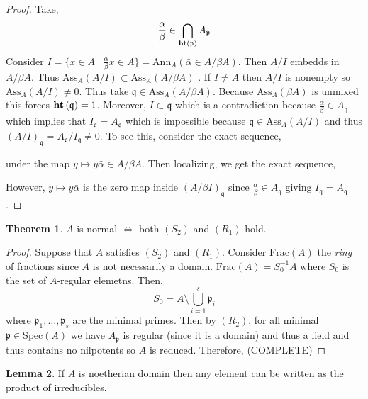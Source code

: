 \documentclass[12pt]{article}
\newcommand{\Frac}[1]{\mathrm{Frac}\left(#1\right)}
\newcommand{\Ann}[2]{\mathrm{Ann}_{#1}\left(#2\right)}
\newcommand{\Ass}[2]{\mathrm{Ass}_{#1}\left( #2 \right)}
\newcommand{\Spec}[1]{\mathrm{Spec}\left( #1 \right)}
\newcommand{\p}{\mathfrak{p}}
\newcommand{\q}{\mathfrak{q}}
\theoremstyle{remark}
\theoremstyle{definition}
\newtheorem{theorem}{Theorem}[section]
\newtheorem{lemma}[theorem]{Lemma}
\begin{document}
\begin{proof}
Take,
\[ \frac{\alpha}{\beta} \in \bigcap_{\height{\p}} A_\p \]
Consider $I = \{ x \in A \mid \frac{\alpha}{\beta} x \in A \} = \Ann{A}{\bar{\alpha} \in A / \beta A}$. Then $A / I$ embedds in $A / \beta A$. Thus $\Ass{A}{A/I} \subset \Ass{A}{A / \beta A}$ . If $I \neq A$ then $A / I$ is nonempty so $\Ass{A}{A/I} \neq 0$. Thus take $\q \in \Ass{A}{A/\beta A}$. Because $\Ass{A}{\beta A}$ is unmixed this forces $\height{\q} = 1$. Moreover, $I \subset \q$ which is a contradiction because $\frac{\alpha}{\beta} \in A_{\q}$ which implies that $I_\q = A_\q$ which is impossible because $\q \in \Ass{A}{A / I}$ and thus $(A / I)_{\q} = A_\q / I_\q \neq 0$. To see this, consider the exact sequence,
\begin{center}
\end{center}
under the map $y \mapsto y \bar{\alpha} \in A / \beta A$. Then localizing, we get the exact sequence,
\begin{center}
\end{center}
However, $y \mapsto y \bar{\alpha}$ is the zero map inside $(A / \beta I)_\q$ since $\frac{\alpha}{\beta} \in A_\q$ giving $I_\q = A_\q$. 
\end{proof}


\begin{theorem}
$A$ is normal $\iff$ both $(S_2)$ and $(R_1)$ hold.
\end{theorem}

\begin{proof}
Suppose that $A$ satisfies $(S_2)$ and $(R_1)$. Consider $\Frac{A}$ the \textit{ring} of fractions since $A$ is not necessarily a domain. $\Frac{A} = S^{-1}_0 A$ where $S_0$ is the set of $A$-regular elemetns. Then,
\[ S_0 = A \setminus \bigcup_{i = 1}^s \p_i \]
where $\p_1, \dots, \p_s$ are the minimal primes. Then by $(R_2)$, for all minimal $\p \in \Spec{A}$ we have $A_\p$ is regular (since it is a domain) and thus a field and thus contains no nilpotents so $A$ is reduced. Therefore,
(COMPLETE)
\end{proof}

\begin{lemma}
If $A$ is noetherian domain then any element can be written as the product of irreducibles.
\end{lemma}
\end{document}

